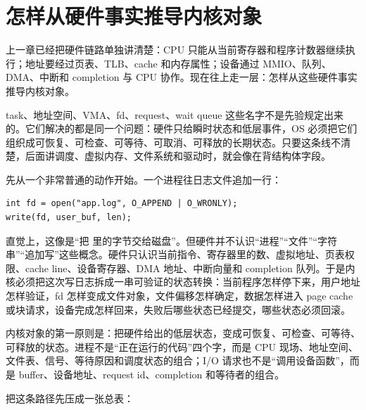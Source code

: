 \chapter{怎样从硬件事实推导内核对象}

上一章已经把硬件链路单独讲清楚：CPU 只能从当前寄存器和程序计数器继续执行；地址要经过页表、TLB、cache 和内存属性；设备通过 MMIO、队列、DMA、中断和 completion 与 CPU 协作。现在往上走一层：怎样从这些硬件事实推导内核对象。

task、地址空间、VMA、fd、request、wait queue 这些名字不是先验规定出来的。它们解决的都是同一个问题：硬件只给瞬时状态和低层事件，OS 必须把它们组织成可恢复、可检查、可等待、可取消、可释放的长期状态。只要这条线不清楚，后面讲调度、虚拟内存、文件系统和驱动时，就会像在背结构体字段。

先从一个非常普通的动作开始。一个进程往日志文件追加一行：

\begin{lstlisting}
int fd = open("app.log", O_APPEND | O_WRONLY);
write(fd, user_buf, len);
\end{lstlisting}

直觉上，这像是“把  里的字节交给磁盘”。但硬件并不认识“进程”“文件”“字符串”“追加写”这些概念。硬件只认识当前指令、寄存器里的数、虚拟地址、页表权限、cache line、设备寄存器、DMA 地址、中断向量和 completion 队列。于是内核必须把这次写日志拆成一串可验证的状态转换：当前程序怎样停下来，用户地址怎样验证，fd 怎样变成文件对象，文件偏移怎样确定，数据怎样进入 page cache 或块请求，设备完成怎样回来，失败后哪些状态已经提交，哪些状态必须回滚。

\begin{keyidea}
内核对象的第一原则是：把硬件给出的低层状态，变成可恢复、可检查、可等待、可释放的状态。进程不是“正在运行的代码”四个字，而是 CPU 现场、地址空间、文件表、信号、等待原因和调度状态的组合；I/O 请求也不是“调用设备函数”，而是 buffer、设备地址、request id、completion 和等待者的组合。
\end{keyidea}

把这条路径先压成一张总表：

